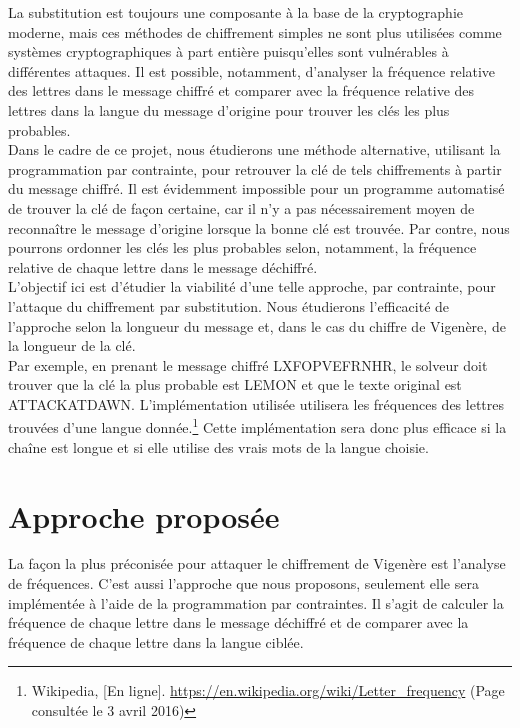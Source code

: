 \documentclass[11pt]{article}
\begin{document}
		La substitution est toujours une composante à la base de la cryptographie moderne, mais ces méthodes de chiffrement simples ne sont plus utilisées comme systèmes cryptographiques à part entière puisqu'elles sont vulnérables à différentes attaques. Il est possible, notamment, d'analyser la fréquence relative des lettres dans le message chiffré et comparer avec la fréquence relative des lettres dans la langue du message d'origine pour trouver les clés les plus probables.\\

		Dans le cadre de ce projet, nous étudierons une méthode alternative, utilisant la programmation par contrainte, pour retrouver la clé de tels chiffrements à partir du message chiffré. Il est évidemment impossible pour un programme automatisé de trouver la clé de façon certaine, car il n'y a pas nécessairement moyen de reconnaître le message d'origine lorsque la bonne clé est trouvée. Par contre, nous pourrons ordonner les clés les plus probables selon, notamment, la fréquence relative de chaque lettre dans le message déchiffré.\\

		L'objectif ici est d'étudier la viabilité d'une telle approche, par contrainte, pour l'attaque du chiffrement par substitution. Nous étudierons l'efficacité de l'approche selon la longueur du message et, dans le cas du chiffre de Vigenère, de la longueur de la clé.\\

		Par exemple, en prenant le message chiffré LXFOPVEFRNHR, le solveur doit trouver que la clé la plus probable est LEMON et que le texte original est ATTACKATDAWN. L'implémentation utilisée utilisera les fréquences des lettres trouvées d'une langue donnée.\footnote{Wikipedia, [En ligne]. \url{https://en.wikipedia.org/wiki/Letter\_frequency} (Page consultée le 3 avril 2016)} Cette implémentation sera donc plus efficace si la chaîne est longue et si elle utilise des vrais mots de la langue choisie.\\

	\section{Approche proposée}

		La façon la plus préconisée pour attaquer le chiffrement de Vigenère est l'analyse de fréquences. C'est aussi l'approche que nous proposons, seulement elle sera implémentée à l'aide de la programmation par contraintes. Il s'agit de calculer la fréquence de chaque lettre dans le message déchiffré et de comparer avec la fréquence de chaque lettre dans la langue ciblée.
\end{document}
